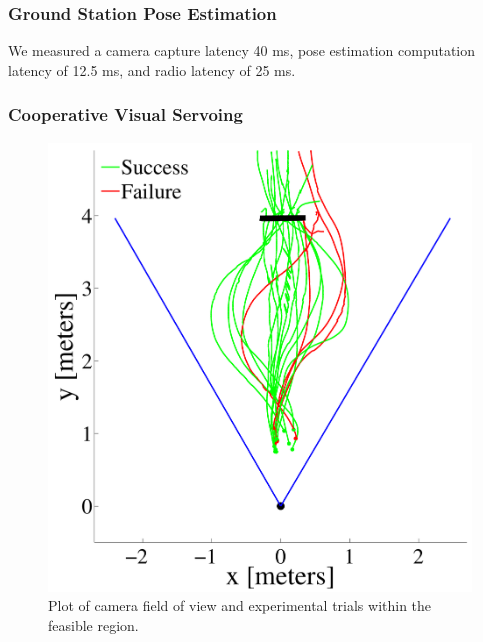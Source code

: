 \documentclass{aamas2013}
\begin{document}
\subsubsection{Ground Station Pose Estimation}

We measured a camera capture latency 40 ms, pose estimation computation 
latency of 12.5 ms, and radio latency of 25 ms.

\subsubsection{Cooperative Visual Servoing}
\label{sec:visual_servoing}

\begin{figure}[tb]
\begin{minipage}[b]{0.45\linewidth}
\centering
\includegraphics[width=\linewidth]{figures/flight_paths_feasible.pdf}
\caption{Plot of camera field of view and experimental trials within the feasible region.}
\label{fig:flight_paths_feasible}
\end{minipage}
\hfill
\begin{minipage}[b]{0.45\linewidth}

\end{minipage}
\end{figure}
\end{document}
